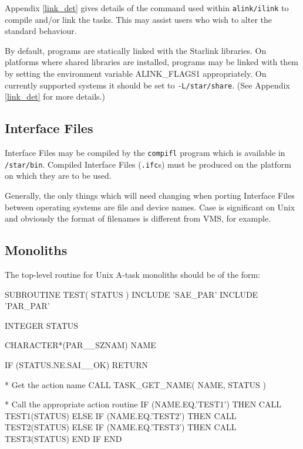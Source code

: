 \documentclass[twoside,11pt,nolof]{starlink}
\begin{document}
Appendix \ref{link_det} gives details of the command used within
\texttt{alink/ilink} to compile and/or link the tasks.
This may assist users who wish to alter the standard behaviour.

By default, programs are statically linked with the Starlink libraries.
On platforms where shared libraries are installed, programs may be linked with
them by setting the environment variable ALINK\_FLAGS1 appropriately.
On currently supported systems it should be set to \texttt{-L/star/share}.
(See Appendix \ref{link_det} for more details.)

\subsection{Interface Files}
Interface Files may be compiled by the \texttt{compifl} program which is
available in \texttt{/star/bin}.
Compiled Interface Files (\texttt{.ifc}s) must be produced on the platform on
which they are to be used.

Generally, the only things which will need changing when porting Interface
Files between operating systems are file and device names.
Case is significant on Unix and obviously the format of filenames is different
from VMS, for example.

\subsection{\label{ADAM_monoliths}Monoliths}
The top-level routine for Unix A-task monoliths should be of the form:
\begin{small}
\begin{terminalv}
          SUBROUTINE TEST( STATUS )
          INCLUDE 'SAE_PAR'
          INCLUDE 'PAR_PAR'

          INTEGER STATUS

          CHARACTER*(PAR__SZNAM) NAME

          IF (STATUS.NE.SAI__OK) RETURN

*       Get the action name
          CALL TASK_GET_NAME( NAME, STATUS )

*       Call the appropriate action routine
          IF (NAME.EQ.'TEST1') THEN
            CALL TEST1(STATUS)
          ELSE IF (NAME.EQ.'TEST2') THEN
            CALL TEST2(STATUS)
          ELSE IF (NAME.EQ.'TEST3') THEN
            CALL TEST3(STATUS)
          END IF
          END
\end{terminalv}
\end{small}
\end{document}

